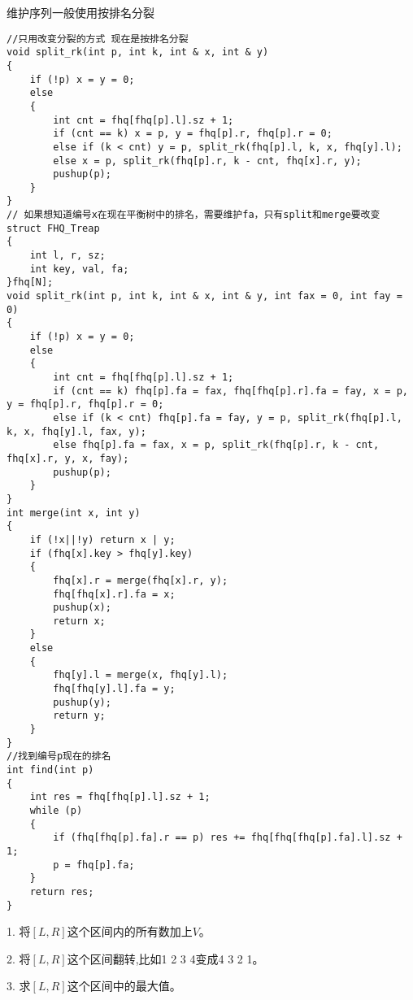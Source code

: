 \documentclass[a4paper, fontset=none]{ctexart}
\begin{document}
维护序列一般使用按排名分裂

\begin{verbatim}
//只用改变分裂的方式 现在是按排名分裂
void split_rk(int p, int k, int & x, int & y)
{
    if (!p) x = y = 0;
    else
    {
        int cnt = fhq[fhq[p].l].sz + 1;
        if (cnt == k) x = p, y = fhq[p].r, fhq[p].r = 0;
        else if (k < cnt) y = p, split_rk(fhq[p].l, k, x, fhq[y].l);
        else x = p, split_rk(fhq[p].r, k - cnt, fhq[x].r, y);
        pushup(p);
    }
}
// 如果想知道编号x在现在平衡树中的排名，需要维护fa，只有split和merge要改变
struct FHQ_Treap
{
    int l, r, sz;
    int key, val, fa;
}fhq[N];
void split_rk(int p, int k, int & x, int & y, int fax = 0, int fay = 0)
{
    if (!p) x = y = 0;
    else
    {
        int cnt = fhq[fhq[p].l].sz + 1;
        if (cnt == k) fhq[p].fa = fax, fhq[fhq[p].r].fa = fay, x = p, y = fhq[p].r, fhq[p].r = 0;
        else if (k < cnt) fhq[p].fa = fay, y = p, split_rk(fhq[p].l, k, x, fhq[y].l, fax, y);
        else fhq[p].fa = fax, x = p, split_rk(fhq[p].r, k - cnt, fhq[x].r, y, x, fay);
        pushup(p);
    }
}
int merge(int x, int y)
{
    if (!x||!y) return x | y;
    if (fhq[x].key > fhq[y].key)
    {
        fhq[x].r = merge(fhq[x].r, y);
        fhq[fhq[x].r].fa = x;
        pushup(x);
        return x;
    }
    else
    {
        fhq[y].l = merge(x, fhq[y].l);
        fhq[fhq[y].l].fa = y;
        pushup(y);
        return y;
    }
}
//找到编号p现在的排名
int find(int p)
{
    int res = fhq[fhq[p].l].sz + 1;
    while (p)
    {
        if (fhq[fhq[p].fa].r == p) res += fhq[fhq[fhq[p].fa].l].sz + 1;
        p = fhq[p].fa;
    }
    return res;
}
\end{verbatim}

1. 将$[L, R]$这个区间内的所有数加上$V$。

2. 将$[L, R]$这个区间翻转,比如1 2 3 4变成4 3 2 1。

3. 求$[L, R]$这个区间中的最大值。
\end{document}
